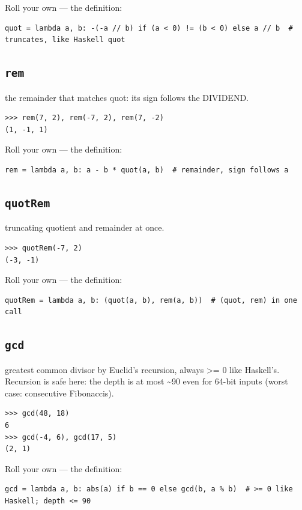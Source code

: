 \documentclass[10pt,letterpaper]{book}
\begin{document}
Roll your own --- the definition:

\begin{lstlisting}[style=ex]
quot = lambda a, b: -(-a // b) if (a < 0) != (b < 0) else a // b  # truncates, like Haskell quot
\end{lstlisting}
\subsection{\texttt{rem}}\label{def:rem}
the remainder that matches quot: its sign follows the DIVIDEND.
\begin{lstlisting}[style=ex]
>>> rem(7, 2), rem(-7, 2), rem(7, -2)
(1, -1, 1)
\end{lstlisting}

Roll your own --- the definition:

\begin{lstlisting}[style=ex]
rem = lambda a, b: a - b * quot(a, b)  # remainder, sign follows a
\end{lstlisting}
\subsection{\texttt{quotRem}}\label{def:quotRem}
truncating quotient and remainder at once.
\begin{lstlisting}[style=ex]
>>> quotRem(-7, 2)
(-3, -1)
\end{lstlisting}

Roll your own --- the definition:

\begin{lstlisting}[style=ex]
quotRem = lambda a, b: (quot(a, b), rem(a, b))  # (quot, rem) in one call
\end{lstlisting}
\subsection{\texttt{gcd}}\label{def:gcd}
greatest common divisor by Euclid's recursion, always >= 0 like Haskell's. Recursion is safe here: the depth is at most \~{}90 even for 64-bit inputs (worst case: consecutive Fibonaccis).
\begin{lstlisting}[style=ex]
>>> gcd(48, 18)
6
>>> gcd(-4, 6), gcd(17, 5)
(2, 1)
\end{lstlisting}

Roll your own --- the definition:

\begin{lstlisting}[style=ex]
gcd = lambda a, b: abs(a) if b == 0 else gcd(b, a % b)  # >= 0 like Haskell; depth <= 90
\end{lstlisting}
\end{document}
